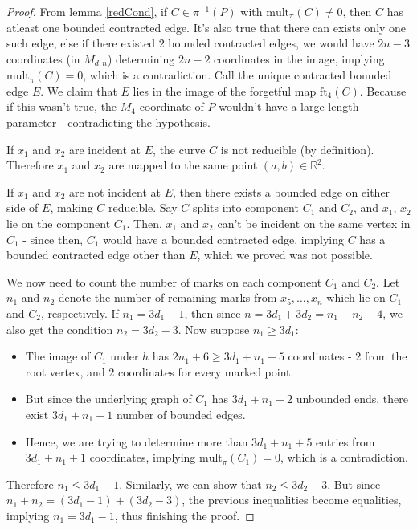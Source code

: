 \begin{proof}
    From lemma \ref{redCond}, if $C \in \pi^{-1}(P)$ with $\text{mult}_{\pi}(C) \neq 0$, then $C$ has atleast one bounded contracted edge.
    It's also true that there can exists only one such edge, else if there existed $2$ bounded contracted edges, we would have $2n-3$ coordinates (in $M_{d,n}$) determining $2n-2$ coordinates in the image, implying $\text{mult}_{\pi}(C) = 0$, which is a contradiction.
    Call the unique contracted bounded edge $E$.
    We claim that $E$ lies in the image of the forgetful map $\text{ft}_{4}(C)$.
    Because if this wasn't true, the $M_{4}$ coordinate of $P$ wouldn't have a large length parameter - contradicting the hypothesis.
    \par If $x_{1}$ and $x_{2}$ are incident at $E$, the curve $C$ is not reducible (by definition).
    Therefore $x_{1}$ and $x_{2}$ are mapped to the same point $(a,b) \in \mathbb{R}^{2}$.
    \par If $x_{1}$ and $x_{2}$ are not incident at $E$, then there exists a bounded edge on either side of $E$, making $C$ reducible.
    Say $C$ splits into component $C_{1}$ and $C_{2}$, and $x_{1},\,x_{2}$ lie on the component $C_{1}$.
    Then, $x_{1}$ and $x_{2}$ can't be incident on the same vertex in $C_{1}$ - since then, $C_{1}$ would have a bounded contracted edge, implying $C$ has a bounded contracted edge other than $E$, which we proved was not possible.
    \par We now need to count the number of marks on each component $C_{1}$ and $C_{2}$.
    Let $n_{1}$ and $n_{2}$ denote the number of remaining marks from $x_{5}, \dots, x_{n}$ which lie on $C_{1}$ and $C_{2}$, respectively.
    If $n_{1} = 3d_{1} - 1$, then since $n = 3d_{1} + 3d_{2} = n_{1}+n_{2}+4$, we also get the condition $n_{2} = 3d_{2} - 3$.
    Now suppose $n_{1} \geq 3d_{1}$:
    \begin{itemize}
        \item The image of $C_{1}$ under $h$ has $2n_{1}+6\geq 3d_{1} + n_{1} + 5 $ coordinates - $2$ from the root vertex, and $2$ coordinates for every marked point.
        \item But since the underlying graph of $C_{1}$ has $3d_{1}+ n_{1}+ 2$ unbounded ends, there exist $3d_{1}+ n_{1} -1 $ number of bounded edges.
        \item Hence, we are trying to determine more than $3d_{1} + n_{1} + 5$ entries from $3d_{1}+ n_{1} +1$ coordinates, implying $\text{mult}_{\pi}(C_{1}) = 0$, which is a contradiction.
    \end{itemize}
    Therefore $n_{1} \leq 3d_{1}-1$.
    Similarly, we can show that $n_{2} \leq 3d_{2}-3$.
    But since $n_{1}+n_{2} = (3d_{1}-1) + (3d_{2}-3)$, the previous inequalities become equalities, implying $n_{1} = 3d_{1}-1$, thus finishing the proof.
\end{proof}

